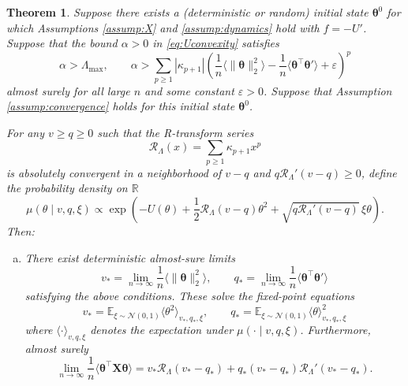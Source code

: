 \documentclass[11pt,letterpaper,reqno]{amsart}
\def\eps{\varepsilon}
\def\E{\mathbb{E}}
\def\R{\mathbb{R}}
\def\btheta{\boldsymbol{\theta}}
\def\X{\mathbf{X}}
\def\cR{\mathcal{R}}
\def\cN{\mathcal{N}}
\newtheorem{theorem}{Theorem}[section]
\theoremstyle{definition}
\numberwithin{equation}{section}
\begin{document}
\begin{theorem}\label{thm:replica}
Suppose there exists a (deterministic or random) initial state $\btheta^0$ for
which Assumptions \ref{assump:X} and \ref{assump:dynamics} hold with $f=-U'$.
Suppose that the bound $\alpha>0$ in
\eqref{eq:Uconvexity} satisfies
\begin{equation}\label{eq:alphacondition}
\alpha>\Lambda_{\max},
\qquad \alpha>\sum_{p \geq 1}|\kappa_{p+1}|
\left(\frac{1}{n}\langle \|\btheta\|_2^2 \rangle
-\frac{1}{n}\langle \btheta^\top \btheta' \rangle+\eps\right)^p
\end{equation}
almost surely for all large $n$ and some constant $\eps>0$.
Suppose that Assumption \ref{assump:convergence} holds for this initial state
$\btheta^0$.

For any $v \geq q \geq 0$ such that the R-transform series
\begin{equation}\label{eq:Rtransform}
\cR_\Lambda(x)=\sum_{p \geq 1} \kappa_{p+1}x^p
\end{equation}
is absolutely convergent in a neighborhood of $v-q$ and $q\cR_\Lambda'(v-q) \geq 0$, define
the probability density on $\R$
\begin{equation}\label{eq:replicalaw}
\mu(\theta \mid v,q,\xi)
\propto
\exp\left(-U(\theta)+\frac{1}{2}\cR_\Lambda(v-q)\theta^2+\sqrt{q\cR_\Lambda'(v-q)}\,\xi\theta\right).
\end{equation}
Then:
\begin{enumerate}[(a)]
\item There exist deterministic almost-sure limits
\begin{equation}\label{eq:vstardef}
v_*=\lim_{n \to \infty}\frac{1}{n}\langle \|\btheta\|_2^2 \rangle,
\qquad q_*=\lim_{n \to \infty}\frac{1}{n}\langle \btheta^\top \btheta' \rangle
\end{equation}
satisfying the above conditions.
These solve the fixed-point equations
\begin{equation}\label{eq:replicafixedpoint}
v_*=\E_{\xi \sim \cN(0,1)}
\langle \theta^2 \rangle_{v_*,q_*,\xi},
\qquad q_*=\E_{\xi \sim \cN(0,1)} \langle \theta \rangle_{v_*,q_*,\xi}^2
\end{equation}
where $\langle \cdot \rangle_{v,q,\xi}$ denotes the expectation under
$\mu(\cdot \mid v,q,\xi)$. Furthermore, almost surely
\begin{equation}\label{eq:thetaXthetalimit}
\lim_{n \to \infty} \frac{1}{n}\langle \btheta^\top \X\btheta\rangle
=v_*\cR_\Lambda(v_*-q_*)+q_*(v_*-q_*)\cR_\Lambda'(v_*-q_*).
\end{equation}

\end{enumerate}
\end{theorem}
\end{document}
